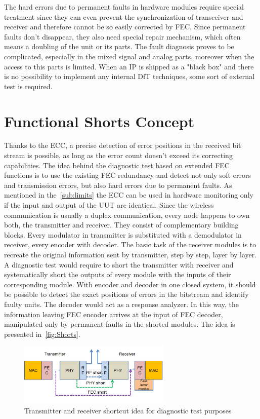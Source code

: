 The hard errors due to permanent faults in hardware modules require special treatment since they can even prevent the synchronization of transceiver and receiver and therefore cannot be so easily corrected by FEC. Since permanent faults don't disappear, they also need special repair mechanism, which often means a doubling of the unit or its parts. The fault diagnosis proves to be complicated, especially in the mixed signal and analog parts, moreover when the access to this parts is limited. When an IP is shipped as a "black box" and there is no possibility to implement any internal DfT techniques, some sort of external test is required. 

\section{Functional Shorts Concept}
Thanks to the ECC, a precise detection of error positions in the received bit stream is possible, as long as the error count doesn't exceed its correcting capabilities. The idea behind the diagnostic test based on extended FEC functions is to use the existing FEC redundancy and detect not only soft errors and transmission errors, but also hard errors due to permanent faults. As mentioned in the~\autoref{sub:limits} the ECC can be used in hardware monitoring only if the input and output of the UUT are identical. Since the wireless communication is usually a duplex communication, every node happens to own both, the transmitter and receiver. They consist of complementary building blocks. Every modulator in transmitter is substituted with a demodulator in receiver, every encoder with decoder. The basic task of the receiver modules is to recreate the original information sent by transmitter, step by step, layer by layer. A diagnostic test would require to short the transmitter with receiver and systematically short the outputs of every module with the inputs of their corresponding module. With encoder and decoder in one closed system, it should be possible to detect the exact positions of errors in the bitstream and identify faulty units. The decoder would act as a response analyzer. In this way, the information leaving FEC encoder arrives at the input of FEC decoder, manipulated only by permanent faults in the shorted modules. The idea is presented in~\autoref{fig:Shorts}. 

\begin{figure}[h]
\centering
\includegraphics[width=0.65\textwidth]{figures/Shorts.png}
\caption{Transmitter and receiver shortcut idea for diagnostic test purposes}
\label{fig:Shorts}
\end{figure}

